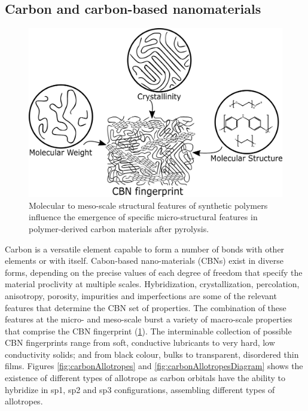 \subsection{Carbon and carbon-based nanomaterials}

\begin{figure}[!th]
\centering
\includegraphics[scale=0.37]{./Figures/CBNfingerprint.png}
\decoRule
\caption[Fingerprint of Carbon-based Nano-materials]{Molecular to meso-scale structural features of synthetic polymers influence the emergence of specific micro-structural features in polymer-derived carbon materials after pyrolysis.}
\label{fig:CBNfingerprint}
\end{figure}

Carbon is a versatile element capable to form a number of bonds with other elements or with itself. Cabon-based nano-materials (CBNs) exist in diverse forms, depending on the precise values of each degree of freedom that specify the material proclivity at multiple scales. Hybridization, crystallization, percolation, anisotropy, porosity, impurities and imperfections are some of the relevant features that determine the CBN set of properties. The combination of these features at the micro- and meso-scale burst a variety of macro-scale properties that comprise the CBN fingerprint (\ref{fig:CBNfingerprint}). The interminable collection of possible CBN fingerprints range from soft, conductive lubricants to very hard, low conductivity solids; and from black colour, bulks to transparent, disordered thin films. \cite{McCreery2008} Figures \ref{fig:carbonAllotropes} and \ref{fig:carbonAllotropesDiagram} shows the existence of different types of allotrope as carbon orbitals have the ability to hybridize in sp1, sp2 and sp3 configurations, assembling different types of allotropes.

